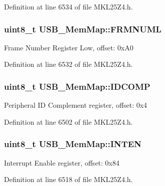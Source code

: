 Definition at line 6534 of file M\+K\+L25\+Z4.\+h.

\subsubsection[{\texorpdfstring{F\+R\+M\+N\+U\+ML}{FRMNUML}}]{\setlength{\rightskip}{0pt plus 5cm}uint8\+\_\+t U\+S\+B\+\_\+\+Mem\+Map\+::\+F\+R\+M\+N\+U\+ML}\hypertarget{struct_u_s_b___mem_map_a13d399a89566e622c5de92668f520768}{}\label{struct_u_s_b___mem_map_a13d399a89566e622c5de92668f520768}
Frame Number Register Low, offset\+: 0x\+A0 

Definition at line 6532 of file M\+K\+L25\+Z4.\+h.

\subsubsection[{\texorpdfstring{I\+D\+C\+O\+MP}{IDCOMP}}]{\setlength{\rightskip}{0pt plus 5cm}uint8\+\_\+t U\+S\+B\+\_\+\+Mem\+Map\+::\+I\+D\+C\+O\+MP}\hypertarget{struct_u_s_b___mem_map_a87d65236c6baf792a723600b0623eca5}{}\label{struct_u_s_b___mem_map_a87d65236c6baf792a723600b0623eca5}
Peripheral ID Complement register, offset\+: 0x4 

Definition at line 6502 of file M\+K\+L25\+Z4.\+h.

\subsubsection[{\texorpdfstring{I\+N\+T\+EN}{INTEN}}]{\setlength{\rightskip}{0pt plus 5cm}uint8\+\_\+t U\+S\+B\+\_\+\+Mem\+Map\+::\+I\+N\+T\+EN}\hypertarget{struct_u_s_b___mem_map_aa19462850c5085330e53ed19397f6e1e}{}\label{struct_u_s_b___mem_map_aa19462850c5085330e53ed19397f6e1e}
Interrupt Enable register, offset\+: 0x84 

Definition at line 6518 of file M\+K\+L25\+Z4.\+h.


